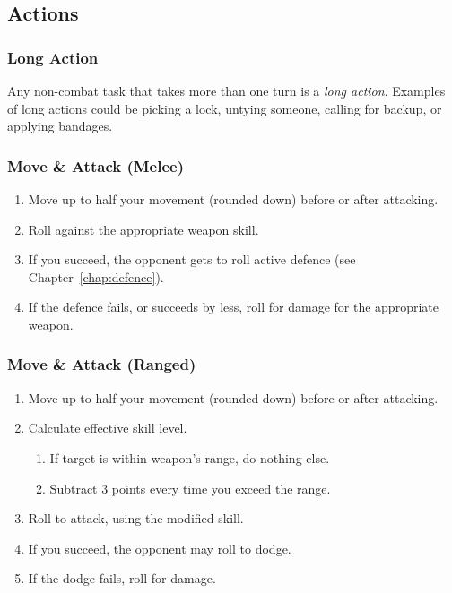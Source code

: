 \subsection{Actions}
\subsubsection{Long Action}
Any non-combat task that takes more than one turn is a \textit{long action}.
Examples of long actions could be picking a lock, untying someone, calling for backup, or applying bandages.

\subsubsection{Move \& Attack (Melee)}
\begin{enumerate}
    \item Move up to half your movement (rounded down) before or after attacking.
    \item Roll against the appropriate weapon skill.
    \item If you succeed, the opponent gets to roll active defence (see Chapter~\ref{chap:defence}).
    \item If the defence fails, or succeeds by less, roll for damage for the appropriate weapon.
\end{enumerate}

\subsubsection{Move \& Attack (Ranged)}
\begin{enumerate}
    \item Move up to half your movement (rounded down) before or after attacking.
    \item Calculate effective skill level.
        \begin{enumerate}
            \item If target is within weapon's range, do nothing else.
            \item Subtract 3 points every time you exceed the range.
        \end{enumerate}
    \item Roll to attack, using the modified skill.
    \item If you succeed, the opponent may roll to dodge.
    \item If the dodge fails, roll for damage.
\end{enumerate}

